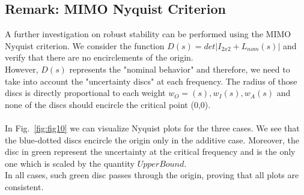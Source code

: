 \documentclass[a4paper, 12pt]{article}
\begin{document}
\subsection*{Remark: MIMO Nyquist Criterion}
A further investigation on robust stability can be performed using the MIMO Nyquist criterion. We consider the function $D(s) = det|I_{2x2} + L_{nom}(s)|$ and verify that there are no encirclements of the origin. 
\\However, $D(s)$ represents the "nominal behavior" and therefore, we need to take into account the "uncertainty discs" at each frequency. The radius of those discs is directly proportional to each weight $w_O=(s), w_I(s), w_A(s)$ and none of the discs should encircle the critical point (0,0).
\\\\In Fig.~\ref{fig:fig10} we can visualize Nyquist plots for the three cases. We see that the blue-dotted discs encircle the origin only in the additive case. Moreover, the disc in green represent the uncertainty at the critical frequency and is the only one which is scaled by the quantity $UpperBound$. 
\\In all cases, such green disc passes through the origin, proving that all plots are consistent.
\end{document}
